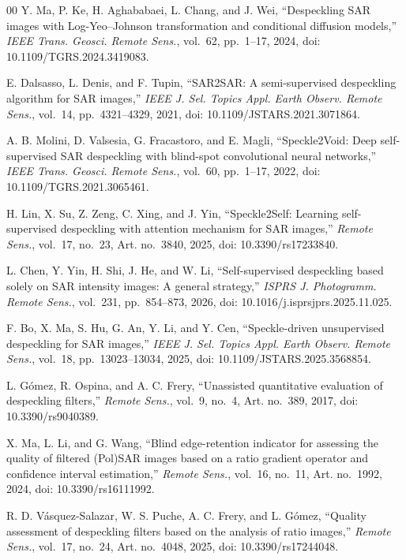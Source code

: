 \documentclass[conference]{IEEEtran}
\begin{document}
\begin{thebibliography}{00}
Y. Ma, P. Ke, H. Aghababaei, L. Chang, and J. Wei, ``Despeckling SAR images with Log-Yeo--Johnson transformation and conditional diffusion models,'' \emph{IEEE Trans. Geosci. Remote Sens.}, vol.~62, pp.~1--17, 2024, doi: 10.1109/TGRS.2024.3419083.

E. Dalsasso, L. Denis, and F. Tupin, ``SAR2SAR: A semi-supervised despeckling algorithm for SAR images,'' \emph{IEEE J. Sel. Topics Appl. Earth Observ. Remote Sens.}, vol.~14, pp.~4321--4329, 2021, doi: 10.1109/JSTARS.2021.3071864.

A. B. Molini, D. Valsesia, G. Fracastoro, and E. Magli, ``Speckle2Void: Deep self-supervised SAR despeckling with blind-spot convolutional neural networks,'' \emph{IEEE Trans. Geosci. Remote Sens.}, vol.~60, pp.~1--17, 2022, doi: 10.1109/TGRS.2021.3065461.

H. Lin, X. Su, Z. Zeng, C. Xing, and J. Yin, ``Speckle2Self: Learning self-supervised despeckling with attention mechanism for SAR images,'' \emph{Remote Sens.}, vol.~17, no.~23, Art. no.~3840, 2025, doi: 10.3390/rs17233840.

L. Chen, Y. Yin, H. Shi, J. He, and W. Li, ``Self-supervised despeckling based solely on SAR intensity images: A general strategy,'' \emph{ISPRS J. Photogramm. Remote Sens.}, vol.~231, pp.~854--873, 2026, doi: 10.1016/j.isprsjprs.2025.11.025.

F. Bo, X. Ma, S. Hu, G. An, Y. Li, and Y. Cen, ``Speckle-driven unsupervised despeckling for SAR images,'' \emph{IEEE J. Sel. Topics Appl. Earth Observ. Remote Sens.}, vol.~18, pp.~13023--13034, 2025, doi: 10.1109/JSTARS.2025.3568854.

L. G\'omez, R. Ospina, and A. C. Frery, ``Unassisted quantitative evaluation of despeckling filters,'' \emph{Remote Sens.}, vol.~9, no.~4, Art. no.~389, 2017, doi: 10.3390/rs9040389.

X. Ma, L. Li, and G. Wang, ``Blind edge-retention indicator for assessing the quality of filtered (Pol)SAR images based on a ratio gradient operator and confidence interval estimation,'' \emph{Remote Sens.}, vol.~16, no.~11, Art. no.~1992, 2024, doi: 10.3390/rs16111992.

R. D. V\'asquez-Salazar, W. S. Puche, A. C. Frery, and L. G\'omez, ``Quality assessment of despeckling filters based on the analysis of ratio images,'' \emph{Remote Sens.}, vol.~17, no.~24, Art. no.~4048, 2025, doi: 10.3390/rs17244048.


\end{thebibliography}
\end{document}
